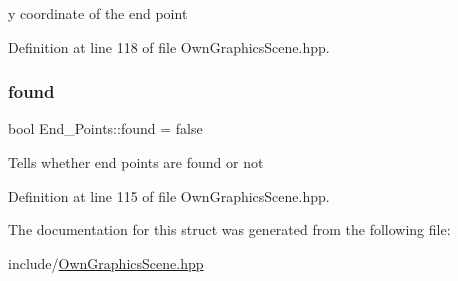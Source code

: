 y coordinate of the end point 

Definition at line 118 of file Own\+Graphics\+Scene.\+hpp.

\mbox{\label{structEnd__Points_aff9dd173210b07bb087d70cf5ec9439f}} 
\subsubsection{\texorpdfstring{found}{found}}
{\footnotesize\ttfamily bool End\+\_\+\+Points\+::found = false}

Tells whether end points are found or not 

Definition at line 115 of file Own\+Graphics\+Scene.\+hpp.



The documentation for this struct was generated from the following file\+:\begin{DoxyCompactItemize}
\item 
include/\mbox{\hyperlink{OwnGraphicsScene_8hpp}{Own\+Graphics\+Scene.\+hpp}}\end{DoxyCompactItemize}
